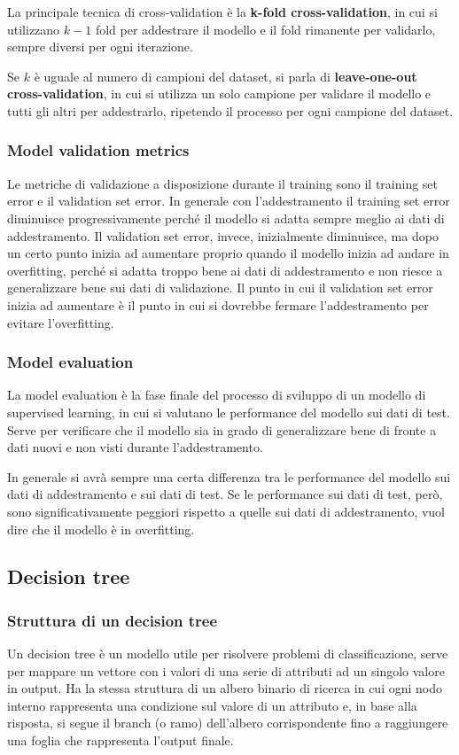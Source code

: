 La principale tecnica di cross-validation è la \textbf{k-fold cross-validation}, in cui si utilizzano \(k-1\) fold per
addestrare il modello e il fold rimanente per validarlo, sempre diversi per ogni iterazione.

Se \(k\) è uguale al numero di campioni del dataset, si parla di \textbf{leave-one-out cross-validation}, in cui si
utilizza un solo campione per validare il modello e tutti gli altri per addestrarlo, ripetendo il processo per ogni
campione del dataset.

\subsubsection*{Model validation metrics}
Le metriche di validazione a disposizione durante il training sono il training set error e il validation set error.
In generale con l'addestramento il training set error diminuisce progressivamente perché il modello si adatta sempre
meglio ai dati di addestramento. Il validation set error, invece, inizialmente diminuisce, ma dopo un certo punto
inizia ad aumentare proprio quando il modello inizia ad andare in overfitting, perché si adatta troppo bene ai dati
di addestramento e non riesce a generalizzare bene sui dati di validazione. Il punto in cui il validation set error
inizia ad aumentare è il punto in cui si dovrebbe fermare l'addestramento per evitare l'overfitting.

\subsubsection*{Model evaluation}
La model evaluation è la fase finale del processo di sviluppo di un modello di supervised learning, in cui si valutano
le performance del modello sui dati di test. Serve per verificare che il modello sia in grado di generalizzare bene
di fronte a dati nuovi e non visti durante l'addestramento.

In generale si avrà sempre una certa differenza tra le performance del modello sui dati di addestramento e sui dati di
test. Se le performance sui dati di test, però, sono significativamente peggiori rispetto a quelle sui dati di addestramento,
vuol dire che il modello è in overfitting.

\subsection{Decision tree}
\subsubsection*{Struttura di un decision tree}
Un decision tree è un modello utile per risolvere problemi di classificazione, serve per mappare un vettore con i valori
di una serie di attributi ad un singolo valore in output. Ha la stessa struttura di un albero binario di ricerca in cui
ogni nodo interno rappresenta una condizione sul valore di un attributo e, in base alla risposta, si segue il branch (o
ramo) dell'albero corrispondente fino a raggiungere una foglia che rappresenta l'output finale.

